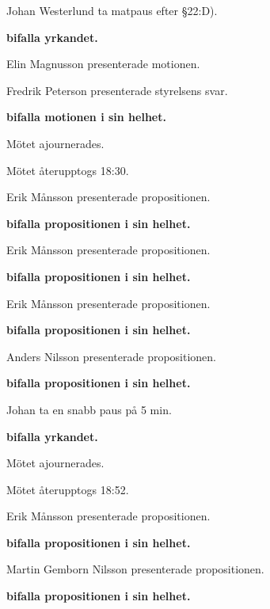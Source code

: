 \documentclass[10pt]{article}
\begin{document}
\begin{paragrafer}
\begin{paragrafer}
      Johan Westerlund \ypa ta matpaus efter \S22:D).

      \textbf{\Mba bifalla yrkandet.}

      Elin Magnusson presenterade motionen.

      Fredrik Peterson presenterade styrelsens svar.

      \textbf{\Mba bifalla motionen i sin helhet.}

      Mötet ajournerades.

      Mötet återupptogs 18:30.

  \end{paragrafer}
    \begin{paragrafer}
      Erik Månsson presenterade propositionen.

      \textbf{\Mba bifalla propositionen i sin helhet.}

        Erik Månsson presenterade propositionen.

        \textbf{\Mba bifalla propositionen i sin helhet.}

        Erik Månsson presenterade propositionen.

        \textbf{\Mba bifalla propositionen i sin helhet.}

        Anders Nilsson presenterade propositionen.

        \textbf{\Mba bifalla propositionen i sin helhet.}

        Johan \ypa ta en snabb paus på 5 min.

        \textbf{\Mba bifalla yrkandet.}

        Mötet ajournerades.

        Mötet återupptogs 18:52.

        Erik Månsson presenterade propositionen.

        \textbf{\Mba bifalla propositionen i sin helhet.}

          Martin Gemborn Nilsson presenterade propositionen.

          \textbf{\Mba bifalla propositionen i sin helhet.}


\end{paragrafer}
\end{paragrafer}
\end{document}
